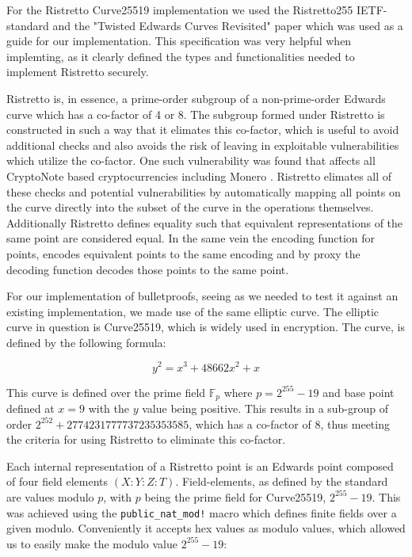 \documentclass{article}
\newcommand{\F}{\mathbb{F}}
\begin{document}
For the Ristretto Curve25519 implementation we used the Ristretto255
IETF-standard \cite{ristretto-ietf} and the "Twisted Edwards Curves
Revisited" paper \cite{edwards-curves} which was used as a guide for our
implementation. This specification was very helpful when implemting,
as it clearly defined the types and functionalities needed to implement
Ristretto securely.

Ristretto is, in essence, a prime-order subgroup of a non-prime-order
Edwards curve which has a co-factor of 4 or 8. The subgroup formed under
Ristretto is constructed in such a way that it elimates this co-factor,
which is useful to avoid additional checks and also avoids the risk of
leaving in exploitable vulnerabilities which utilize the co-factor. One
such vulnerability was found that affects all CryptoNote based
cryptocurrencies including Monero \cite{cryptonote}. Ristretto elimates
all of these checks and potential vulnerabilities by automatically
mapping all points on the curve directly into the subset of the curve
in the operations themselves. Additionally Ristretto defines equality
such that equivalent representations of the same point are considered
equal. In the same vein the encoding function for points, encodes
equivalent points to the same encoding and by proxy the decoding
function decodes those points to the same point.

For our implementation of bulletproofs, seeing as we needed to test it
against an existing implementation, we made use of the same elliptic
curve. The elliptic curve in question is Curve25519, which is widely
used in encryption. The curve, is defined by the following formula:

$$y^2 = x^3 + 48662x^2 + x$$

This curve is defined over the prime field $\F_p$ where $p =
2^{255} - 19$ and base point defined at $x = 9$ with the $y$ value
being positive. This results in a sub-group of order $2^{252} +
2774231777737235353585$, which has a co-factor of $8$, thus meeting
the criteria for using Ristretto to eliminate this co-factor.

Each internal representation of a Ristretto point is an Edwards point
composed of four field elements $(X : Y : Z : T)$. Field-elements,
as defined by the standard are values modulo $p$, with $p$ being the
prime field for Curve25519, $2^{255} - 19$. This was achieved using
the \texttt{public\_nat\_mod!} macro which defines finite fields over
a given modulo. Conveniently it accepts hex values as modulo values,
which allowed us to easily make the modulo value $2^{255} - 19$:
\end{document}
